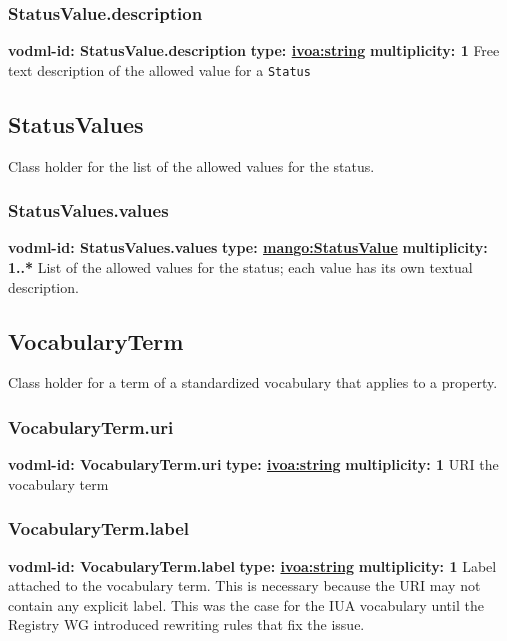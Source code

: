     \subsubsection{StatusValue.description}
      \textbf{vodml-id: StatusValue.description} \newline
      \textbf{type: \hyperref[sect:ivoa]{ivoa:string}} \newline
      \textbf{multiplicity: 1} \newline
      Free text description of the allowed value for a \texttt{Status}

  \subsection{StatusValues}
  \label{sect:StatusValues}
    Class holder for the list of the allowed values for the status.

    \subsubsection{StatusValues.values}
      \textbf{vodml-id: StatusValues.values} \newline
      \textbf{type: \hyperref[sect:StatusValue]{mango:StatusValue}} \newline
      \textbf{multiplicity: 1..*} \newline
      List of the allowed values for the status; each value has its own textual description.

  \subsection{VocabularyTerm}
  \label{sect:VocabularyTerm}
    Class holder for a term of a standardized vocabulary that applies to a property.

    \subsubsection{VocabularyTerm.uri}
      \textbf{vodml-id: VocabularyTerm.uri} \newline
      \textbf{type: \hyperref[sect:ivoa]{ivoa:string}} \newline
      \textbf{multiplicity: 1} \newline
      URI the vocabulary term

    \subsubsection{VocabularyTerm.label}
      \textbf{vodml-id: VocabularyTerm.label} \newline
      \textbf{type: \hyperref[sect:ivoa]{ivoa:string}} \newline
      \textbf{multiplicity: 1} \newline
      Label attached to the vocabulary term. This is necessary because the URI may not contain any explicit label. This was the case for the IUA vocabulary until the Registry WG introduced rewriting rules that fix the issue.

